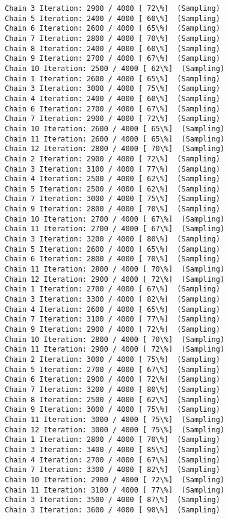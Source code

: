 \documentclass[11pt]{article}
\begin{document}
\begin{Verbatim}[commandchars=\\\{\}]
Chain 3 Iteration: 2900 / 4000 [ 72\%]  (Sampling)
Chain 5 Iteration: 2400 / 4000 [ 60\%]  (Sampling)
Chain 6 Iteration: 2600 / 4000 [ 65\%]  (Sampling)
Chain 7 Iteration: 2800 / 4000 [ 70\%]  (Sampling)
Chain 8 Iteration: 2400 / 4000 [ 60\%]  (Sampling)
Chain 9 Iteration: 2700 / 4000 [ 67\%]  (Sampling)
Chain 10 Iteration: 2500 / 4000 [ 62\%]  (Sampling)
Chain 1 Iteration: 2600 / 4000 [ 65\%]  (Sampling)
Chain 3 Iteration: 3000 / 4000 [ 75\%]  (Sampling)
Chain 4 Iteration: 2400 / 4000 [ 60\%]  (Sampling)
Chain 6 Iteration: 2700 / 4000 [ 67\%]  (Sampling)
Chain 7 Iteration: 2900 / 4000 [ 72\%]  (Sampling)
Chain 10 Iteration: 2600 / 4000 [ 65\%]  (Sampling)
Chain 11 Iteration: 2600 / 4000 [ 65\%]  (Sampling)
Chain 12 Iteration: 2800 / 4000 [ 70\%]  (Sampling)
Chain 2 Iteration: 2900 / 4000 [ 72\%]  (Sampling)
Chain 3 Iteration: 3100 / 4000 [ 77\%]  (Sampling)
Chain 4 Iteration: 2500 / 4000 [ 62\%]  (Sampling)
Chain 5 Iteration: 2500 / 4000 [ 62\%]  (Sampling)
Chain 7 Iteration: 3000 / 4000 [ 75\%]  (Sampling)
Chain 9 Iteration: 2800 / 4000 [ 70\%]  (Sampling)
Chain 10 Iteration: 2700 / 4000 [ 67\%]  (Sampling)
Chain 11 Iteration: 2700 / 4000 [ 67\%]  (Sampling)
Chain 3 Iteration: 3200 / 4000 [ 80\%]  (Sampling)
Chain 5 Iteration: 2600 / 4000 [ 65\%]  (Sampling)
Chain 6 Iteration: 2800 / 4000 [ 70\%]  (Sampling)
Chain 11 Iteration: 2800 / 4000 [ 70\%]  (Sampling)
Chain 12 Iteration: 2900 / 4000 [ 72\%]  (Sampling)
Chain 1 Iteration: 2700 / 4000 [ 67\%]  (Sampling)
Chain 3 Iteration: 3300 / 4000 [ 82\%]  (Sampling)
Chain 4 Iteration: 2600 / 4000 [ 65\%]  (Sampling)
Chain 7 Iteration: 3100 / 4000 [ 77\%]  (Sampling)
Chain 9 Iteration: 2900 / 4000 [ 72\%]  (Sampling)
Chain 10 Iteration: 2800 / 4000 [ 70\%]  (Sampling)
Chain 11 Iteration: 2900 / 4000 [ 72\%]  (Sampling)
Chain 2 Iteration: 3000 / 4000 [ 75\%]  (Sampling)
Chain 5 Iteration: 2700 / 4000 [ 67\%]  (Sampling)
Chain 6 Iteration: 2900 / 4000 [ 72\%]  (Sampling)
Chain 7 Iteration: 3200 / 4000 [ 80\%]  (Sampling)
Chain 8 Iteration: 2500 / 4000 [ 62\%]  (Sampling)
Chain 9 Iteration: 3000 / 4000 [ 75\%]  (Sampling)
Chain 11 Iteration: 3000 / 4000 [ 75\%]  (Sampling)
Chain 12 Iteration: 3000 / 4000 [ 75\%]  (Sampling)
Chain 1 Iteration: 2800 / 4000 [ 70\%]  (Sampling)
Chain 3 Iteration: 3400 / 4000 [ 85\%]  (Sampling)
Chain 4 Iteration: 2700 / 4000 [ 67\%]  (Sampling)
Chain 7 Iteration: 3300 / 4000 [ 82\%]  (Sampling)
Chain 10 Iteration: 2900 / 4000 [ 72\%]  (Sampling)
Chain 11 Iteration: 3100 / 4000 [ 77\%]  (Sampling)
Chain 3 Iteration: 3500 / 4000 [ 87\%]  (Sampling)
Chain 3 Iteration: 3600 / 4000 [ 90\%]  (Sampling)

\end{Verbatim}
\end{document}
